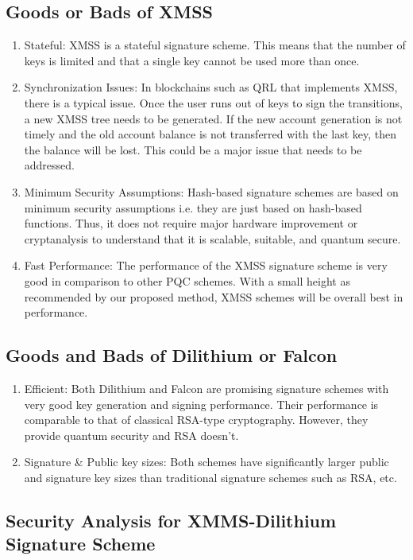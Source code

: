 \documentclass[5p,times]{elsarticle}
\theoremstyle{definition}
\theoremstyle{remark}
\numberwithin{equation}{section}
\begin{document}
\subsection{Goods or Bads of XMSS}
\begin{enumerate}
    \item Stateful: XMSS is a stateful signature scheme. This means that the number of keys is limited and that a single key cannot be used more than once.
    \item Synchronization Issues: In blockchains such as QRL \cite{QuantumResistantLedger2016} that implements XMSS, there is a typical issue. Once the user runs out of keys to sign the transitions, a new XMSS tree needs to be generated. 
    If the new account generation is not timely and the old account balance is not transferred with the last key, then the balance will be lost. This could be a major issue that needs to be addressed.
    \item Minimum Security Assumptions: Hash-based signature schemes are based on minimum security assumptions i.e. they are just based on hash-based functions. Thus, it does not require major hardware improvement or cryptanalysis to understand that it is scalable, suitable, and quantum secure.
    \item Fast Performance: The performance of the XMSS signature scheme is very good in comparison to other PQC schemes. With a small height as recommended by our proposed method, XMSS schemes will be overall best in performance.   
\end{enumerate}

\subsection{Goods and Bads of Dilithium or Falcon}
\begin{enumerate}
    \item Efficient: Both Dilithium and Falcon are promising signature schemes with very good key generation and signing performance. 
    Their performance is comparable to that of classical RSA-type cryptography. However, they provide quantum security and RSA doesn't. 
    \item Signature \& Public key sizes: Both schemes have significantly larger public and signature key sizes than traditional signature schemes such as RSA, etc.
\end{enumerate}

\subsection{Security Analysis for XMMS-Dilithium Signature Scheme}
\end{document}

